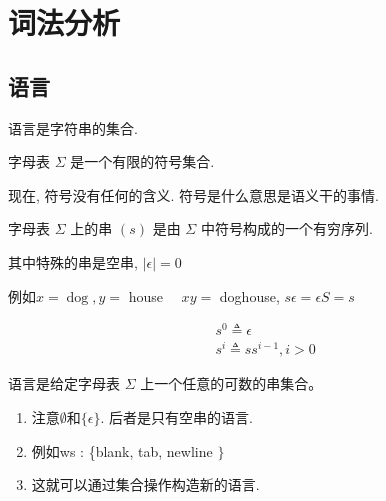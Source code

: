 \documentclass{ctexart}
\begin{document}

\section{词法分析}

\subsection{语言}

语言是字符串的集合. 

\begin{definition}[字母表]
    字母表 $\Sigma$ 是一个有限的符号集合. 
\end{definition}

现在, 符号没有任何的含义. 符号是什么意思是语义干的事情. 

\begin{definition}[字母表]
    字母表 $\Sigma$ 上的串 $(s)$ 是由 $\Sigma$ 中符号构成的一个有穷序列.
\end{definition}

其中特殊的串是空串, $|\epsilon|=0$

\begin{definition}[串上的连接运算]
    例如$x=\operatorname{dog}, y=$ house $\quad x y=$ doghouse, $s \epsilon=\epsilon S=s$
\end{definition}

\begin{definition}[串上的指数运算]
    $$
\begin{aligned}
&s^0 \triangleq \epsilon\\
&s^i \triangleq s s^{i-1}, i>0
\end{aligned}
$$
\end{definition}

\begin{definition}
    语言是给定字母表 $\Sigma$ 上一个任意的可数的串集合。
\end{definition}

\begin{remark}
    \begin{enumerate}
        \item 注意$\emptyset$和$\{\epsilon\}$. 后者是只有空串的语言. 
        \item 例如ws : \{blank, tab, newline $\}$
        \item 这就可以通过集合操作构造新的语言.
    \end{enumerate}
    
\end{remark}
\end{document}
